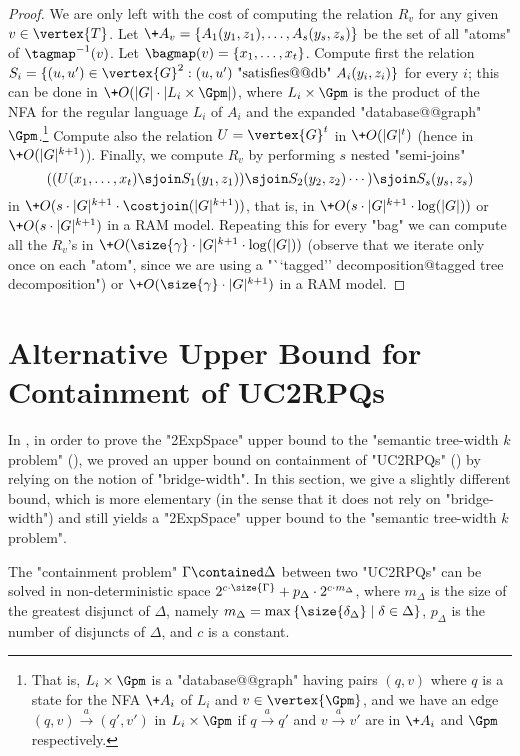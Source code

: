 \begin{proof}
    We are only left with the cost of computing the relation $R_v$ for any given $v \in \vertex{T}$. Let $\+A_v= \set{A_1(y_1,z_1), \dotsc, A_s(y_s,z_s)}$ be the set of all "atoms" of $\tagmap^{-1}(v)$. Let $\bagmap(v)=\set{x_1, \dotsc, x_t}$.
    Compute first the relation $S_i = \set{ (u,u') \in \vertex{G}^2 : (u,u') \text{ "satisfies@@db" } A_i(y_i,z_i)}$ for every $i$; this can be done in $\+O(|G| \cdot |L_i \times \Gpm|)$, where $L_i \times \Gpm$ is the product of the NFA for the regular language $L_i$ of $A_i$ and the expanded "database@@graph" $\Gpm$.\footnote{That is, $L_i \times \Gpm$ is a  "database@@graph" having pairs $(q,v)$ where $q$ is a state for the NFA $\+A_i$ of $L_i$ and $v \in \vertex{\Gpm}$, and we have an edge $(q,v) \xrightarrow{a} (q',v')$ in $L_i \times \Gpm$ if  $q \xrightarrow{a} q'$ and $v \xrightarrow{a} v'$ are in $\+A_i$ and $\Gpm$ respectively.} Compute also the relation $U = \vertex{G}^t$ in $\+O(|G|^{t})$ (hence in $\+O(|G|^{k+1})$). Finally, we compute $R_v$ by performing $s$ nested "semi-joins" 
    \[
        ((U(x_1, \dotsc, x_t) \sjoin S_1(y_1,z_1)) \sjoin S_2(y_2,z_2) \dotsb )\sjoin S_s(y_s,z_s) 
    \]
    in $\+O(s \cdot |G|^{k+1} \cdot \costjoin(|G|^{k+1}))$, that is, in $\+O(s \cdot |G|^{k+1} \cdot \log(|G|))$ or $\+O(s \cdot |G|^{k+1})$ in a RAM model. Repeating this for every "bag" we can compute all the $R_v$'s in $\+O(\size{\gamma} \cdot |G|^{k+1} \cdot \log(|G|))$ (observe that we iterate only once on each "atom", since we are using a "``tagged'' decomposition@tagged tree decomposition") or $\+O(\size{\gamma} \cdot |G|^{k+1})$ in a RAM model.
\end{proof}


\section{\AP{}Alternative Upper Bound for Containment of UC2RPQs}
\label{apdx-sec:alternative-upper-bound-containment}

In , in order to prove the "2ExpSpace" upper bound to the 
"semantic tree-width $k$ problem" (), we proved an upper bound on containment
of "UC2RPQs" () by relying on the notion of "bridge-width".
In this section, we give a slightly different bound, which is more elementary (in the sense that it 
does not rely on "bridge-width") and still yields a "2ExpSpace" upper bound to the "semantic 
tree-width $k$ problem".

\begin{proposition}
	\AP\label{prop:bound-containment-pb-alt}
	The "containment problem" $\Gamma \contained \Delta$ between two "UC2RPQs" can be solved in non-deterministic space $2^{c\cdot \size{\Gamma}} + p_{\Delta} \cdot 2^{c\cdot m_\Delta}$, where $m_\Delta$ is the size of the greatest disjunct of $\Delta$, namely $m_\Delta = \max{\{\size{\delta_\Delta} \mid \delta \in \Delta\}}$, $p_\Delta$
	is the number of disjuncts of $\Delta$, and $c$ is a constant.
\end{proposition}

